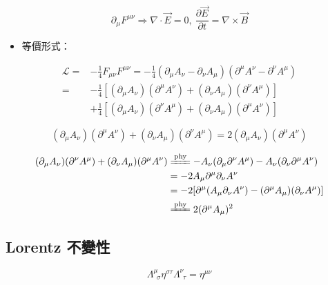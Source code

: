 \documentclass{article}
\begin{document}
$$\partial_{\mu}F^{\mu\nu}\Rightarrow\nabla\cdot\vec{E}=0,\ \frac{\partial\vec{E}}{\partial t}=\nabla\times\vec{B}$$

\begin{itemize}
  \item 等價形式：
\end{itemize}

$$\begin{aligned}
    \mathcal{L}= & -\frac{1}{4}F_{\mu\nu}F^{\mu\nu}=-\frac{1}{4}(\partial_{\mu}A_{\nu}-\partial_{\nu}A_{\mu})(\partial^{\mu}A^{\nu}-\partial^{\nu}A^{\mu}) \\
    =            & -\frac{1}{4}[(\partial_{\mu}A_{\nu})(\partial^{\mu}A^{\nu})+(\partial_{\nu}A_{\mu})(\partial^{\nu}A^{\mu})]                             \\
                 & +\frac{1}{4}[(\partial_{\mu}A_{\nu})(\partial^{\nu}A^{\mu})+(\partial_{\nu}A_{\mu})(\partial^{\mu}A^{\nu})]
  \end{aligned}$$

$$(\partial_{\mu}A_{\nu})(\partial^{\mu}A^{\nu})+(\partial_{\nu}A_{\mu})(\partial^{\nu}A^{\mu})=2(\partial_{\mu}A_{\nu})(\partial^{\mu}A^{\nu})$$

$$\begin{aligned}
    (\partial_{\mu}A_{\nu})(\partial^{\nu}A^{\mu})+(\partial_{\nu}A_{\mu})(\partial^{\mu}A^{\nu}) & \xlongequal{\mathrm{phy}}-A_{\nu}(\partial_{\mu}\partial^{\nu}A^{\mu})-A_{\nu}(\partial_{\nu}\partial^{\mu}A^{\nu}) \\
                                                                                                  & =-2A_{\mu}\partial^{\mu}\partial_{\nu}A^{\nu}                                                                       \\
                                                                                                  & =-2[\partial^{\mu}(A_{\mu}\partial_{\nu}A^{\nu})-(\partial^{\mu}A_{\mu})(\partial_{\nu}A^{\mu})]                    \\
                                                                                                  & \xlongequal{\mathrm{phy}}2(\partial^{\mu}A_{\mu})^2
  \end{aligned}$$

\subsection{Lorentz 不變性}

$$\Lambda^{\mu}_{\ \ \sigma}\eta^{\sigma\tau}\Lambda^{\nu}_{\ \ \tau}=\eta^{\mu\nu}$$
\end{document}
